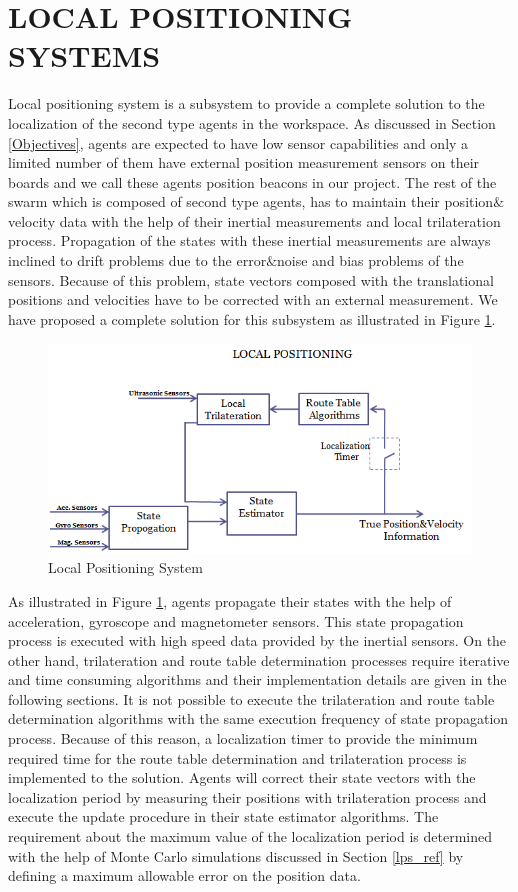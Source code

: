 \section{LOCAL POSITIONING SYSTEMS} \label{LOCAL POSITIONING SYSTEMS_ref}
Local positioning system is a subsystem to provide a complete solution to the localization of the second type agents in the workspace. As discussed in Section \ref{Objectives}, agents are expected to have low sensor capabilities and only a limited number of them have external position measurement sensors on their boards and we call these agents position beacons in our project. The rest of the swarm which is composed of second type agents, has to maintain their position$\&$velocity data with the help of their inertial measurements and local trilateration process. Propagation of the states with these inertial measurements are always inclined to drift problems due to the error$\&$noise and bias problems of the sensors. Because of this problem, state vectors composed with the translational positions and velocities have to be corrected with an external measurement. We have proposed a complete solution for this subsystem as illustrated in Figure \ref{figure_lps}.

\begin{figure}[H]
\caption{Local Positioning System} \label{figure_lps}
\centering
\includegraphics[scale = 0.65]{lps}
\end{figure}

As illustrated in Figure \ref{figure_lps}, agents propagate their states with the help of acceleration, gyroscope and magnetometer sensors. This state propagation process is executed with high speed data provided by the inertial sensors. On the other hand, trilateration and route table determination processes require iterative and time consuming algorithms and their implementation details are given in the following sections. It is not possible to execute the trilateration and route table determination algorithms with the same execution frequency of state propagation process. Because of this reason, a localization timer to provide the minimum required time for the route table determination and trilateration process is implemented to the solution. Agents will correct their state vectors with the localization period by measuring their positions with trilateration process and execute the update procedure in their state estimator algorithms. The requirement about the maximum value of the localization period is determined with the help of Monte Carlo simulations discussed in Section \ref{lps_ref} by defining a maximum allowable error on the position data.

